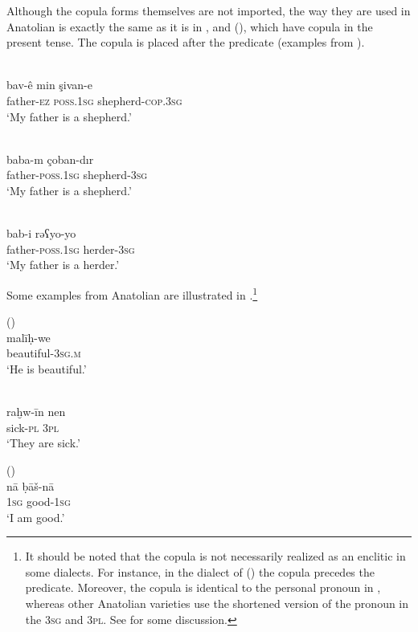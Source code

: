 \documentclass[output=paper]{langsci/langscibook}
\begin{document}
Although the {copula} forms themselves are not imported, the way they are used in Anatolian  is exactly the same as it is in ,  and  (), which have {copula} in the present {tense}. The {copula} is placed after the predicate (examples from \citealt{Grigore2007article}).


\begin{exe}
\ex \label{cop}
		\begin{xlist}
		\ex {} \\\label{copkrm}\gll bav-ê min şivan-e		\\
    father-\textsc{ez} \textsc{poss.1sg}		shepherd-\textsc{cop.3sg} \\
       \glt `My father is a shepherd.'

	\ex {} \\
	\label{coptk} \gll baba-m 		çoban-dır\\
	father-\textsc{poss.1sg}		shepherd-\textsc{3sg}\\
        \glt  `My father is a shepherd.'


		\ex {}\\ \label{copara} \gll  bab-i		rəʕyo-yo\\
		father-\textsc{poss.1sg}		herder-\textsc{3sg}\\
      \glt  `My father is a herder.'
        \end{xlist}

\end{exe}


\noindent Some examples from Anatolian  are illustrated in .\footnote{It should be noted that the {copula} is not necessarily realized as an enclitic in some dialects. For instance, in the dialect of  (\citealt{Jastrow2011anatolian}) the {copula} precedes the
predicate. Moreover, the {copula} is identical to the personal pronoun in , whereas other Anatolian varieties use the shortened version of the pronoun in the 3\textsc{sg} and 3\textsc{pl}. See \cite{Akkus2016} for some discussion. }

\begin{exe}
\ex \label{copt}
		\begin{xlist}
		\ex {}  (\citealt[131]{Jastrow1978}) \\\label{copkr}\gll malī\d{h}-we		\\
    beautiful-\textsc{3sg.m} \\
       \glt `He is beautiful.'

	\ex {}  \\
	\label{copts} \gll raḫw-īn nen\\
	sick-\textsc{pl} \textsc{3pl}\\
        \glt  `They are sick.'

		\ex {}  (\citealt[40]{Jastrow1973})\\ \label{coparam} \gll  nā ḅāš-nā\\
		\textsc{1sg} good-\textsc{1sg}\\
      \glt  `I am good.'
        \end{xlist}

\end{exe}
\end{document}
